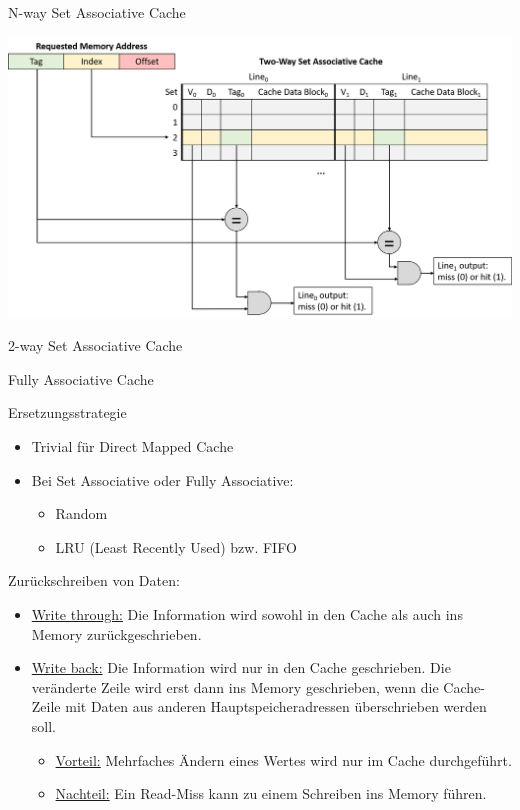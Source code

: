 \begin{defi}{N-way Set Associative Cache}


  \centering
  \includegraphics[width=.9\linewidth]{images/2-way_set_associative_cache_request.png}
\end{defi}

\begin{example}{2-way Set Associative Cache}
\end{example}

\begin{defi}{Fully Associative Cache}

\end{defi}

\begin{defi}{Ersetzungsstrategie}
  \begin{itemize}
    \item Trivial für Direct Mapped Cache
    \item Bei Set Associative oder Fully Associative:
          \begin{itemize}
            \item Random
            \item LRU (Least Recently Used) bzw. FIFO
          \end{itemize}
  \end{itemize}
  Zurückschreiben von Daten:
  \begin{itemize}
    \item \underline{Write through:} Die Information wird sowohl in den Cache als auch ins
          Memory zurückgeschrieben.
    \item \underline{Write back:} Die Information wird nur in den Cache geschrieben. Die
          veränderte Zeile wird erst dann ins Memory geschrieben, wenn die
          Cache-Zeile mit Daten aus anderen Hauptspeicheradressen
          überschrieben werden soll.
          \begin{itemize}
            \item \underline{Vorteil:} Mehrfaches Ändern eines Wertes wird nur im Cache durchgeführt.
            \item \underline{Nachteil:} Ein Read-Miss kann zu einem Schreiben ins Memory führen.
          \end{itemize}
  \end{itemize}
\end{defi}

